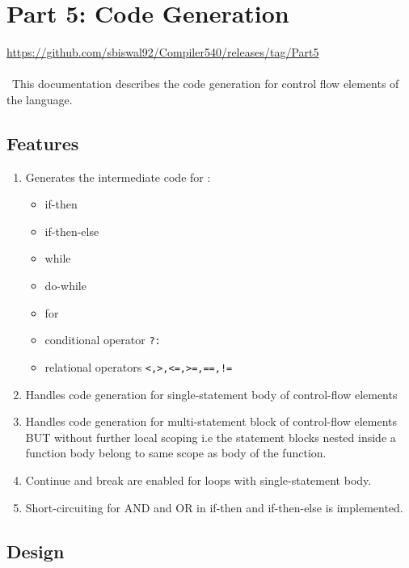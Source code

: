\documentclass[12pt]{article}
\begin{document}
\section{Part 5: Code Generation} 

\url{https://github.com/sbiswal92/Compiler540/releases/tag/Part5}
\\~
\\~This documentation describes the code generation for control flow elements of the language.

\subsection{Features}
\label{Features}
\begin{enumerate}
\item Generates the intermediate code for :
\begin {itemize}
\item if-then
\item if-then-else
\item while
\item do-while
\item for
\item conditional operator \texttt{?:}
\item relational operators \texttt{<,>,<=,>=,==,!=}
\end{itemize}
\item Handles code generation for single-statement body of control-flow elements
\item Handles code generation for multi-statement block of control-flow elements BUT without further local scoping i.e the statement blocks nested inside a function body belong to same scope as body of the function.
\item Continue and break are enabled for loops with single-statement body.
\item Short-circuiting for AND and OR in if-then and if-then-else is implemented.
\end{enumerate}


\subsection{Design}
\end{document}
